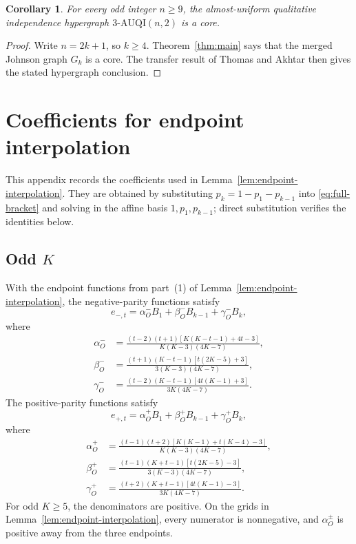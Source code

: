 \documentclass[11pt]{article}
\theoremstyle{plain}
\newtheorem{corollary}[theorem]{Corollary}
\theoremstyle{remark}
\begin{document}
\begin{corollary}\label{cor:AUQI}
For every odd integer $n\ge9$, the almost-uniform qualitative independence
hypergraph $3\text{-}\mathrm{AUQI}(n,2)$ is a core.
\end{corollary}

\begin{proof}
Write $n=2k+1$, so $k\ge4$.  Theorem~\ref{thm:main} says that the merged
Johnson graph $G_k$ is a core.  The transfer result of Thomas and Akhtar
\cite[Lemma~7 and Proposition~7]{ThomasAkhtar2026} then gives the stated
hypergraph conclusion.
\end{proof}

\appendix

\section{Coefficients for endpoint interpolation}\label{app:interpolation}

This appendix records the coefficients used in
Lemma~\ref{lem:endpoint-interpolation}.  They are obtained by substituting
$p_k=1-p_1-p_{k-1}$ into \eqref{eq:full-bracket} and solving in the affine
basis $1,p_1,p_{k-1}$; direct substitution verifies the identities below.

\subsection*{Odd \(K\)}

With the endpoint functions from part~(1) of
Lemma~\ref{lem:endpoint-interpolation}, the negative-parity functions satisfy
\begin{equation}\label{eq:odd-minus-interp}
 e_{-,t}=\alpha^-_OB_1+\beta^-_OB_{k-1}+\gamma^-_OB_k,
\end{equation}
where
\begin{align*}
 \alpha^-_O&=\frac{(t-2)(t+1)[K(K-t-1)+4t-3]}
 {K(K-3)(4K-7)},\\
 \beta^-_O&=\frac{(t+1)(K-t-1)[t(2K-5)+3]}
 {3(K-3)(4K-7)},\\
 \gamma^-_O&=\frac{(t-2)(K-t-1)[4t(K-1)+3]}
 {3K(4K-7)}.
\end{align*}
The positive-parity functions satisfy
\begin{equation}\label{eq:odd-plus-interp}
 e_{+,t}=\alpha^+_OB_1+\beta^+_OB_{k-1}+\gamma^+_OB_k,
\end{equation}
where
\begin{align*}
 \alpha^+_O&=\frac{(t-1)(t+2)[K(K-1)+t(K-4)-3]}
 {K(K-3)(4K-7)},\\
 \beta^+_O&=\frac{(t-1)(K+t-1)[t(2K-5)-3]}
 {3(K-3)(4K-7)},\\
 \gamma^+_O&=\frac{(t+2)(K+t-1)[4t(K-1)-3]}
 {3K(4K-7)}.
\end{align*}
For odd $K\ge5$, the denominators are positive.  On the grids in
Lemma~\ref{lem:endpoint-interpolation}, every numerator is nonnegative, and
$\alpha^\pm_O$ is positive away from the three endpoints.
\end{document}
